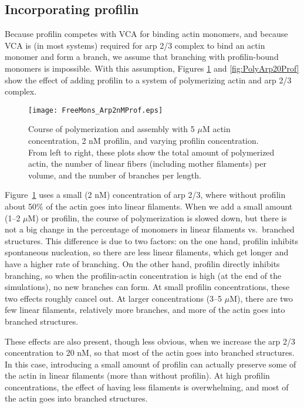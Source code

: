 \documentclass[11pt]{article}
\begin{document}
\subsection{Incorporating profilin}
Because profilin competes with VCA for binding actin monomers, and because VCA is (in most systems) required for arp 2/3 complex to bind an actin monomer and form a branch, we assume that branching with profilin-bound monomers is impossible. With this assumption, Figures \ref{fig:PolyArp2Prof} and \ref{fig:PolyArp20Prof} show the effect of adding profilin to a system of polymerizing actin and arp 2/3 complex.

\begin{figure}
\centering
\texttt{[image: FreeMons\_Arp2nMProf.eps]}
\caption{\label{fig:PolyArp2Prof}Course of polymerization and assembly with 5 $\mu$M actin concentration, 2 nM profilin, and varying profilin concentration. From left to right, these plots show the total amount of polymerized actin, the number of linear fibers (including mother filaments) per volume, and the number of branches per length.  }
\end{figure}

Figure\ \ref{fig:PolyArp2Prof} uses a small (2 nM) concentration of arp 2/3, where without profilin about 50\% of the actin goes into linear filaments. When we add a small amount (1--2 $\mu$M) or profilin, the course of polymerization is slowed down, but there is not a big change in the percentage of monomers in linear filaments vs.\ branched structures. This difference is due to two factors: on the one hand, profilin inhibits spontaneous nucleation, so there are less linear filaments, which get longer and have a higher rate of branching. On the other hand, profilin directly inhibits branching, so when the profilin-actin concentration is high (at the end of the simulations), no new branches can form. At small profilin concentrations, these two effects roughly cancel out. At larger concentrations (3--5 $\mu$M), there are two few linear filaments, relatively more branches, and more of the actin goes into branched structures. 

These effects are also present, though less obvious, when we increase the arp 2/3 concentration to 20 nM, so that most of the actin goes into branched structures. In this case, introducing a small amount of profilin can actually preserve some of the actin in linear filaments (more than without profilin). At high profilin concentrations, the effect of having less filaments is overwhelming, and most of the actin goes into branched structures.
\end{document}
